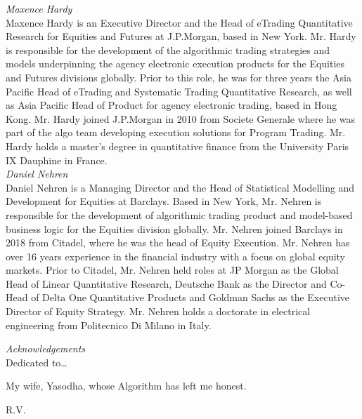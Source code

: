 {\noindent\large\itshape Maxence Hardy} \\[0.2cm]
\noindent Maxence Hardy is an Executive Director and the Head of eTrading Quantitative Research for Equities and Futures at J.P.Morgan, based in New York. Mr. Hardy is responsible for the development of the algorithmic trading strategies and models underpinning the agency electronic execution products for the Equities and Futures divisions globally. Prior to this role, he was for three years the Asia Pacific Head of eTrading and Systematic Trading Quantitative Research, as well as Asia Pacific Head of Product for agency electronic trading, based in Hong Kong. Mr. Hardy joined J.P.Morgan in 2010 from Societe Generale where he was part of the algo team developing execution solutions for Program Trading. Mr. Hardy holds a master's degree in quantitative finance from the University Paris IX Dauphine in France. \\


{\noindent\large\itshape Daniel Nehren} \\[0.2cm]
\noindent Daniel Nehren is a Managing Director and the Head of Statistical Modelling and Development for Equities at Barclays. Based in New York, Mr. Nehren is responsible for the development of algorithmic trading product and model-based business logic for the Equities division globally. Mr. Nehren joined Barclays in 2018 from Citadel, where he was the head of Equity Execution. Mr. Nehren has over 16 years experience in the financial industry with a focus on global equity markets. Prior to Citadel, Mr. Nehren held roles at JP Morgan as the Global Head of Linear Quantitative Research, Deutsche Bank as the Director and Co-Head of Delta One Quantitative Products and Goldman Sachs as the Executive Director of Equity Strategy. Mr. Nehren holds a doctorate in electrical engineering from Politecnico Di Milano in Italy.



\newpage



{\itshape \large Acknowledgements} \\

Dedicated to\dots \\

\begin{minipage}[t]{0.8\textwidth}
	\raggedright
  	My wife, Yasodha, whose Algorithm has left me honest. \par
  	\raggedleft
  	R.V.
\end{minipage} \vspace{1cm}


